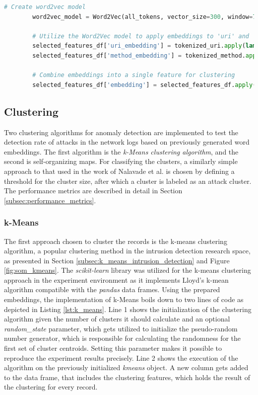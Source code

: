 \documentclass[
    fontsize=12pt,
    headings=small,
    parskip=half,           %
    bibliography=totoc,
    numbers=noenddot,       %
    open=any,               %
    ]{scrreprt}
\begin{document}
\begin{minipage}\linewidth
	\begin{lstlisting}[language={python}, caption={Creation of Word2Vec model and word embeddings}, label={lst:word2vec}] 
		# Create word2vec model
		word2vec_model = Word2Vec(all_tokens, vector_size=300, window=7, min_count=1, workers=4)
		
		# Utilize the Word2Vec model to apply embeddings to 'uri' and 'method' values
		selected_features_df['uri_embedding'] = tokenized_uri.apply(lambda x: sum(word2vec_model.wv[t] for t in x))
		selected_features_df['method_embedding'] = tokenized_method.apply(lambda x: sum(word2vec_model.wv[t] for t in x))
		
		# Combine embeddings into a single feature for clustering
		selected_features_df['embedding'] = selected_features_df.apply(lambda row: row['uri_embedding'] + row['method_embedding'], axis=1)
	\end{lstlisting}
\end{minipage}

\subsection{Clustering}
Two clustering algorithms for anomaly detection are implemented to test the detection rate of attacks in the network logs based on previously generated word embeddings. The first algorithm is the \emph{k-Means clustering algorithm}, and the second is self-organizing maps. For classifying the clusters, a similarly simple approach to that used in the work of Nalavade et al. \cite{nalavade2014} is chosen by defining a threshold for the cluster size, after which a cluster is labeled as an attack cluster. The performance metrics are described in detail in Section \ref{subsec:performance_metrics}.

\subsubsection{k-Means}
The first approach chosen to cluster the records is the k-means clustering algorithm, a popular clustering method in the intrusion detection research space, as presented in Section \ref{subsec:k_means_intrusion_detection} and Figure \ref{fig:som_kmeans}. The \emph{scikit-learn} \cite{scikitlearn2011} library was utilized for the k-means clustering approach in the experiment environment as it implements Lloyd's k-mean algorithm compatible with the \emph{pandas} data frames. Using the prepared embeddings, the implementation of k-Means boils down to two lines of code as depicted in Listing \ref{lst:k_means}. Line 1 shows the initialization of the clustering algorithm given the number of clusters it should calculate and an optional \emph{random\_state} parameter, which gets utilized to initialize the pseudo-random number generator, which is responsible for calculating the randomness for the first set of cluster centroids. Setting this parameter makes it possible to reproduce the experiment results precisely. Line 2 shows the execution of the algorithm on the previously initialized \emph{kmeans} object. A new column gets added to the data frame, that includes the clustering features, which holds the result of the clustering for every record. 
\end{document}
